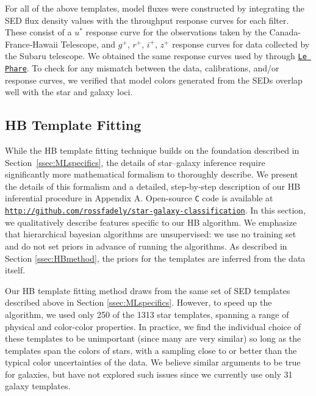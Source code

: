 \documentclass[12pt,preprint]{aastex}
\begin{document}
For all of the above templates, model fluxes were constructed by 
integrating the SED flux density values with the throughput response 
curves for each filter.  These consist of a $u^\ast$ response curve for 
the observations taken by the Canada-France-Hawaii Telescope, and 
$g^+$, $r^+$, $i^+$, $z^+$ response curves for data 
collected by the Subaru telescope.  We obtained the same response 
curves used by \citet{ilbert09} through 
\href{http://www.cfht.hawaii.edu/\%7Earnouts/LEPHARE/lephare.html}
{\texttt{Le Phare}}\footnotemark[5].  To check for any mismatch between 
the data, calibrations, and/or response curves, we verified that model 
colors generated from the SEDs overlap well with the star and galaxy loci.

\subsection{HB Template Fitting}
\label{ssec:HBspecifics}

While the HB template fitting technique builds on the foundation
described in Section~\ref{ssec:MLspecifics}, the details of
star--galaxy inference require significantly more mathematical
formalism to thoroughly describe.  We present the details of this
formalism and a detailed, step-by-step description of our HB
inferential procedure in Appendix A.  Open-source \texttt{C} code is
available at {\footnotesize
  \texttt{\url{http://github.com/rossfadely/star-galaxy-classification}}}.
In this section, we qualitatively describe features specific to our HB
algorithm.  We emphasize that hierarchical bayesian algorithms are
unsupervised: we use no training set and do not set priors in advance
of running the algorithms.  As described in Section \ref{ssec:HBmethod}, 
the priors for the templates are inferred from the data itself.

Our HB template fitting method draws from the same set of SED
templates described above in Section \ref{ssec:MLspecifics}.  However,
to speed up the algorithm, we used only 250 of the 1313 star
templates, spanning a range of physical and color-color properties.  In 
practice, we find the individual choice of these templates to be 
unimportant (since many are very similar) so long as the templates span 
the colors of stars, with a sampling close to or better than the typical color 
uncertainties of the data.  We believe similar arguments to be true for 
galaxies, but have not explored such issues since we currently use only 
31 galaxy templates.
\end{document}
